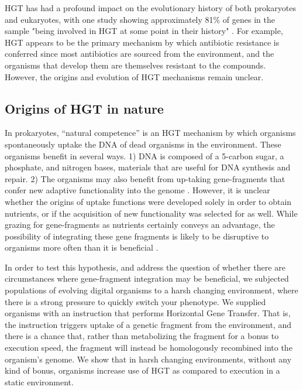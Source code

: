 \documentclass[PhD]{msu-thesis}
\begin{document}
HGT has had a profound impact on the evolutionary history of both prokaryotes and eukaryotes, with one study showing approximately 81\% of genes in the sample "being involved in HGT at some point in their history" \cite{dagan_modular_2008}. For example, HGT appears to be the primary mechanism by which antibiotic resistance is conferred \cite{davies_origins_1997,martinez_antibiotics_2008} since most antibiotics are sourced from the environment, and the organisms that develop them are themselves resistant to the compounds.
However, the origins and evolution of HGT mechanisms remain unclear. 

\subsection{Origins of HGT in nature}
In prokaryotes, “natural competence” is an HGT mechanism by which organisms spontaneously uptake the DNA of dead organisms in the environment. These organisms benefit in several ways. 1) DNA is composed of a 5-carbon sugar, a phosphate, and nitrogen bases, materials that are useful for DNA synthesis and repair. 2) The organisms may also benefit from up-taking gene-fragments that confer new adaptive functionality into the genome \cite{vos_why_2009}. However, it is unclear whether the origins of uptake functions were developed solely in order to obtain nutrients, or if the acquisition of new functionality was selected for as well. While grazing for gene-fragments as nutrients certainly conveys an advantage, the possibility of integrating these gene fragments is likely to be disruptive to organisms more often than it is beneficial \cite{redfield_evolution_1997}.

In order to test this hypothesis, and address the question of whether there are circumstances where gene-fragment integration may be beneficial, we subjected populations of evolving digital organisms to a harsh changing environment, where there is a strong pressure to quickly switch your phenotype. We supplied organisms with an instruction that performs Horizontal Gene Transfer. That is, the instruction triggers uptake of a genetic fragment from the environment, and there is a chance that, rather than metabolizing the fragment for a bonus to execution speed, the fragment will instead be homologously recombined into the organism's genome. We show that in harsh changing environments, without any kind of bonus, organisms increase use of HGT as compared to execution in a static environment.
\end{document}

